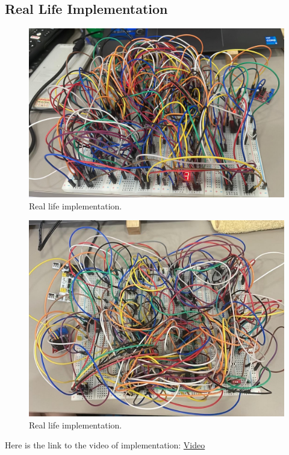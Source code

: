 \documentclass{article}
\begin{document}
\subsection{Real Life Implementation}
\begin{figure}[h]
    \centering
    \includegraphics[width=12cm]{Pic/Proteus/real life imp.jpg}
    \caption{Real life implementation.}
    \label{fig:enter-label}
\end{figure}

\begin{figure}[h]
    \centering
    \includegraphics[width=12cm]{Pic/Proteus/real life imp 2.jpg}
    \caption{Real life implementation.}
    \label{fig:enter-label}
\end{figure}

Here is the link to the video of implementation: \href{https://drive.google.com/file/d/1nSew7hscdaEV-AUZaBXrrWRVpo7kgrah/view?usp=sharing}{Video}
\newpage
\end{document}
